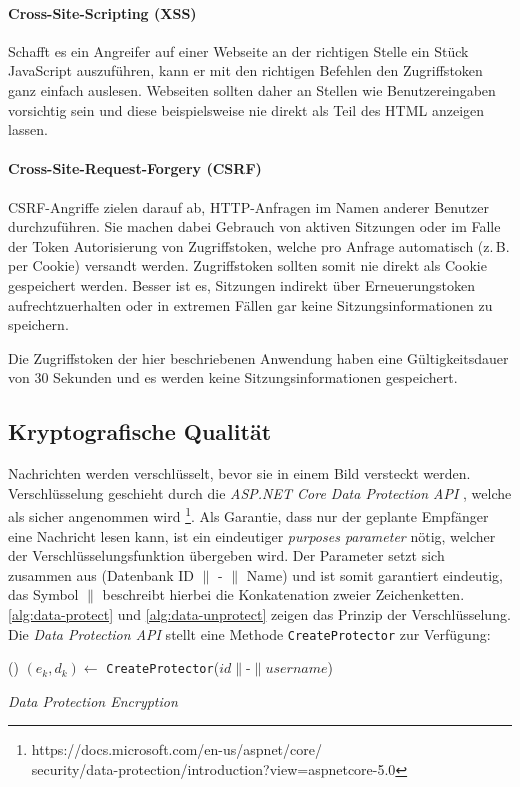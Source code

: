 \paragraph{Cross-Site-Scripting (XSS)}
Schafft es ein Angreifer auf einer Webseite an der richtigen Stelle
ein Stück JavaScript auszuführen,
kann er mit den richtigen Befehlen den Zugriffstoken ganz einfach auslesen.
Webseiten sollten daher an Stellen wie Benutzereingaben vorsichtig sein und diese
beispielsweise nie direkt als Teil des HTML anzeigen lassen.

\paragraph{Cross-Site-Request-Forgery (CSRF)}
CSRF-Angriffe zielen darauf ab, HTTP-An\-fragen im
Namen anderer Benutzer durchzuführen. Sie machen dabei Gebrauch von
aktiven Sitzungen oder im Falle der Token Autorisierung von Zugriffstoken,
welche pro Anfrage automatisch (z.\,B. per Cookie) versandt werden.
Zugriffstoken sollten somit nie direkt als Cookie gespeichert werden. Besser
ist es, Sitzungen indirekt über Erneuerungstoken aufrechtzuerhalten oder
in extremen Fällen gar keine Sitzungsinformationen zu speichern.

\noindent
Die Zugriffstoken der hier beschriebenen Anwendung haben eine Gültigkeitsdauer
von 30 Sekunden und es werden keine Sitzungsinformationen gespeichert.

\subsection{Kryptografische Qualität}
Nachrichten werden verschlüsselt, bevor sie in einem Bild versteckt werden.
Verschlüssel\-ung geschieht durch die \textit{ASP.NET Core Data Protection API}
, welche als sicher angenommen wird \footnote{https://docs.microsoft.com/en-us/aspnet/core/\\
  security/data-protection/introduction?view=aspnetcore-5.0}.
Als Garantie, dass nur der geplante Empfänger eine Nachricht lesen
kann, ist ein eindeutiger \textit{purposes parameter} nötig, welcher
der Verschlüsselungsfunktion übergeben wird.
Der Parameter setzt sich zusammen aus (Datenbank ID $\parallel$ - $\parallel$ Name)
und ist somit garantiert eindeutig, das Symbol $\parallel$
beschreibt hierbei die Konkatenation zweier Zeichenketten.
\autoref{alg:data-protect} und \ref{alg:data-unprotect}
zeigen das Prinzip der Verschlüsselung. Die \textit{Data Protection API} stellt
eine Methode \texttt{CreateProtector} zur Verfügung:
\begin{algorithm}[h]
  \DontPrintSemicolon
  \Begin(){
    $(e_k, d_k) \leftarrow$ \texttt{CreateProtector}($id \parallel \text{-} \parallel username$)\;
  }
  \caption{\textit{Data Protection Encryption}}
  \label{alg:data-protect}
\end{algorithm}

